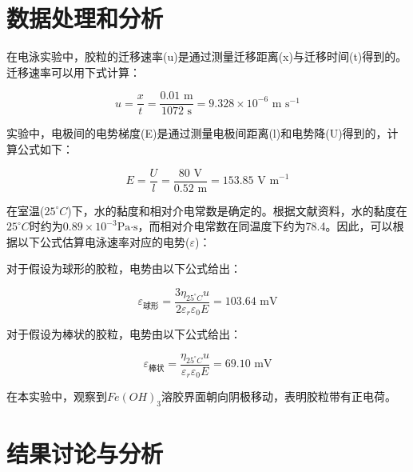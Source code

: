 \documentclass[12pt,hyperref,a4paper,UTF8]{ctexart}
\begin{document}
\section{数据处理和分析}

在电泳实验中，胶粒的迁移速率(u)是通过测量迁移距离(x)与迁移时间(t)得到的。迁移速率可以用下式计算：

\begin{equation}
	u = \frac{x}{t} = \frac{0.01 \text{ m}}{1072 \text{ s}} = 9.328 \times 10^{-6} \text{ m s}^{-1}
\end{equation}

实验中，电极间的电势梯度(E)是通过测量电极间距离(l)和电势降(U)得到的，计算公式如下：

\begin{equation}
	E = \frac{U}{l} = \frac{80 \text{ V}}{0.52 \text{ m}} = 153.85 \text{ V m}^{-1}
\end{equation}

在室温($25^{\circ}C$)下，水的黏度和相对介电常数是确定的。根据文献资料，水的黏度在$25^{\circ}C$时约为$0.89 \times 10^{-3} \text{Pa·s}$\cite{1}，而相对介电常数在同温度下约为78.4\cite{2}。因此，可以根据以下公式估算电泳速率对应的电势($\varepsilon$)：

对于假设为球形的胶粒，电势由以下公式给出：

\begin{equation}
	\varepsilon_{\text{球形}} = \frac{3 \eta_{25^{\circ}C} u}{2 \varepsilon_r \varepsilon_0 E} = 103.64 \text{ mV}
\end{equation}

对于假设为棒状的胶粒，电势由以下公式给出：

\begin{equation}
	\varepsilon_{\text{棒状}} = \frac{\eta_{25^{\circ}C} u}{\varepsilon_r \varepsilon_0 E} = 69.10 \text{ mV}
\end{equation}

在本实验中，观察到$Fe(OH)_3$溶胶界面朝向阴极移动，表明胶粒带有正电荷。

\section{结果讨论与分析}
\end{document}
